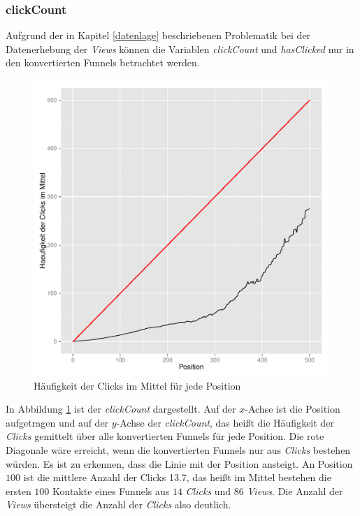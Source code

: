 \subsubsection*{clickCount}
Aufgrund der in Kapitel \ref{datenlage} beschriebenen Problematik bei der Datenerhebung der \textit{Views} können die Variablen \textit{clickCount} und \textit{hasClicked} nur in den konvertierten Funnels betrachtet werden.
\begin{figure}[H]
    \centering
    \includegraphics[scale=0.5]{clickCountSucc.pdf}
    \caption[Häufigkeit der Clicks im Mittel]{Häufigkeit der Clicks im Mittel für jede Position}
    \label{clickCount}
\end{figure}
\noindent In Abbildung \ref{clickCount} ist der \textit{clickCount} dargestellt. Auf der $x$-Achse ist die Position aufgetragen und auf der $y$-Achse der \textit{clickCount}, das heißt die Häufigkeit der \textit{Clicks} gemittelt über alle konvertierten Funnels für jede Position. Die rote Diagonale wäre erreicht, wenn die konvertierten Funnels nur aus \textit{Clicks} bestehen würden. Es ist zu erkennen, dass die Linie mit der Position ansteigt. An Position $100$ ist die mittlere Anzahl der Clicks 13.7, das heißt im Mittel bestehen die ersten $100$ Kontakte eines Funnels aus $14$ \textit{Clicks} und $86$ \textit{Views}. Die Anzahl der \textit{Views} übersteigt die Anzahl der \textit{Clicks} also deutlich.\\

